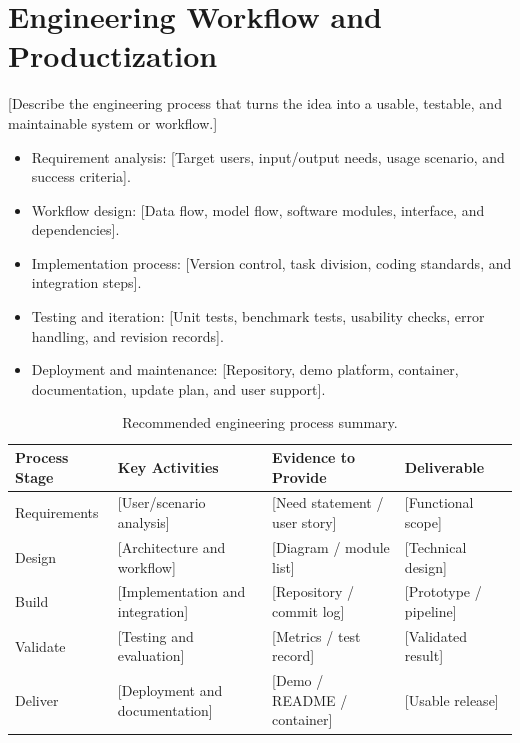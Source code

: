 \documentclass[11pt,a4paper]{article}
\newcommand{\placeholder}[1]{[#1]}
\begin{document}
\section{Engineering Workflow and Productization}
\placeholder{Describe the engineering process that turns the idea into a usable, testable, and maintainable system or workflow.}
\begin{itemize}
  \item Requirement analysis: \placeholder{Target users, input/output needs, usage scenario, and success criteria}.
  \item Workflow design: \placeholder{Data flow, model flow, software modules, interface, and dependencies}.
  \item Implementation process: \placeholder{Version control, task division, coding standards, and integration steps}.
  \item Testing and iteration: \placeholder{Unit tests, benchmark tests, usability checks, error handling, and revision records}.
  \item Deployment and maintenance: \placeholder{Repository, demo platform, container, documentation, update plan, and user support}.
\end{itemize}

\begin{table}[h]
\centering
\renewcommand{\arraystretch}{1.25}
\begin{tabularx}{\textwidth}{p{}X X X}
\toprule
\textbf{Process Stage} & \textbf{Key Activities} & \textbf{Evidence to Provide} & \textbf{Deliverable}\\
\midrule
Requirements & \placeholder{User/scenario analysis} & \placeholder{Need statement / user story} & \placeholder{Functional scope}\\
Design & \placeholder{Architecture and workflow} & \placeholder{Diagram / module list} & \placeholder{Technical design}\\
Build & \placeholder{Implementation and integration} & \placeholder{Repository / commit log} & \placeholder{Prototype / pipeline}\\
Validate & \placeholder{Testing and evaluation} & \placeholder{Metrics / test record} & \placeholder{Validated result}\\
Deliver & \placeholder{Deployment and documentation} & \placeholder{Demo / README / container} & \placeholder{Usable release}\\
\bottomrule
\end{tabularx}
\caption{Recommended engineering process summary.}
\end{table}
\end{document}
